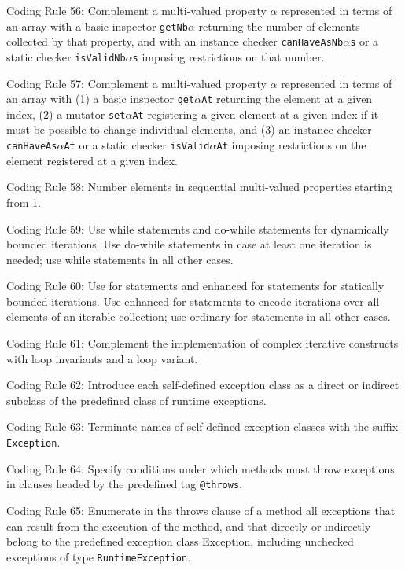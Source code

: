 \documentclass{article}
\begin{document}
\par Coding Rule 56: Complement a multi-valued property $\alpha$ represented in terms of an array  with a basic inspector \texttt{getNb}$\alpha$ returning the number of elements collected by that  property, and with an instance checker \texttt{canHaveAsNb}$\alpha$\texttt{s} or a static checker \texttt{isValidNb}$\alpha$\texttt{s} imposing restrictions on that number.
\par Coding Rule 57: Complement a multi-valued property $\alpha$ represented in terms of an array  with (1) a basic inspector \texttt{get}$\alpha$\texttt{At} returning the element at a given index, (2) a  mutator \texttt{set}$\alpha$\texttt{At} registering a given element at a given index if it must be possible to change individual elements, and (3) an instance checker \texttt{canHaveAs}$\alpha$\texttt{At} or a static  checker \texttt{isValid}$\alpha$\texttt{At} imposing restrictions on the element registered at a given index.
\par Coding Rule 58: Number elements in sequential multi-valued properties starting from 1.
\par Coding Rule 59: Use while statements and do-while statements for dynamically bounded  iterations. Use do-while statements in case at least one iteration is needed; use while statements in all other cases.
\par Coding Rule 60: Use for statements and enhanced for statements for statically bounded  iterations. Use enhanced for statements to encode iterations over all elements of an iterable collection; use ordinary for statements in all other cases.
\par Coding Rule 61: Complement the implementation of complex iterative constructs with loop invariants and a loop variant.
\par Coding Rule 62: Introduce each self-defined exception class as a direct or indirect subclass of the predefined class of runtime exceptions.
\par Coding Rule 63: Terminate names of self-defined exception classes with the suffix \texttt{Exception}.
\par Coding Rule 64: Specify conditions under which methods must throw exceptions in  clauses headed by the predefined tag \texttt{@throws}.
\par Coding Rule 65: Enumerate in the throws clause of a method all exceptions that can result from the execution of the method, and that directly or indirectly belong to the  predefined exception class Exception, including unchecked exceptions of type \texttt{RuntimeException}.
\end{document}
